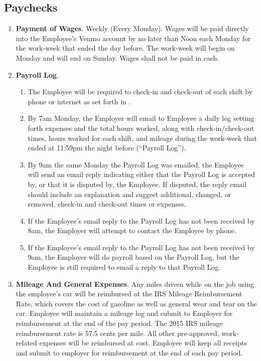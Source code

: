 \documentclass[]{article}
\begin{document}
\subsection*{Paychecks}
\begin{enumerate}
	\item{\textbf{Payment of Wages}}. Weekly (Every Monday). Wages will be paid directly into the Employee's Venmo account by no later than Noon each Monday for the work-week that ended the day before. The work-week will begin on Monday and will end on Sunday. Wages shall not be paid in cash.
	\item{\textbf{Payroll Log}}. 
		\begin{enumerate}
			\item The Employee will be required to check-in and check-out of each shift by phone or internet as set forth in \basic{}. 
			\item By 7am Monday, the Employer will email to Employee a daily log setting forth expenses and the total hours worked, along with check-in/check-out times, hours worked for each shift, and mileage during the work-week that ended at 11:59pm the night before (``Payroll Log'').
			\item By 9am the same Monday the Payroll Log was emailed, the Employee will send an email reply indicating either that the Payroll Log is accepted by, or that it is disputed by, the Employee. If disputed, the reply email should include an explanation and suggest additional, changed, or removed, check-in and check-out times or expenses.
			\item If the Employee's email reply to the Payroll Log has not been received by 8am, the Employer will attempt to contact the Employee by phone.
			\item If the Employee's email reply to the Payroll Log has not been received by 9am, the Employer will do payroll based on the Payroll Log, but the Employee is still required to email a reply to that Payroll Log.
		\end{enumerate}
	\item{\textbf{Mileage And General Expenses}}. Any miles driven while on the job using the employee's car will be reimbursed at the IRS Mileage Reimbursement Rate, which covers the cost of gasoline as well as general wear and tear on the car. Employee will maintain a mileage log and submit to Employer for reimbursement at the end of the pay period. The 2015 IRS mileage reimbursement rate is 57.5 cents per mile.  All other pre-approved, work-related expenses will be reimbursed at cost. Employee will keep all receipts and submit to employer for reimbursement at the end of each pay period.

\end{enumerate}
\end{document}
